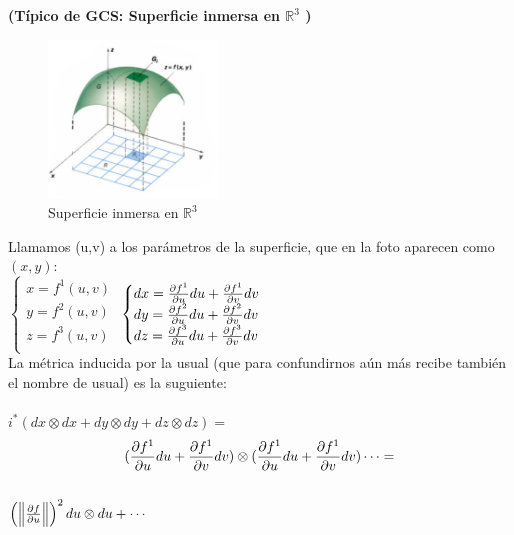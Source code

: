 \documentclass[palatino, bibnumbers]{apuntes}
\begin{document}
\begin{example}\textbf{(Típico de GCS: Superficie inmersa en $ℝ^3$ )}\\ 
	\begin{figure}
		\begin{center}
			\includegraphics[width=0.40\textwidth]{img/GT17_parametric_surface}
		\end{center}
		\caption{Superficie inmersa en $ℝ^3$ }
	\end{figure}
Llamamos (u,v) a los parámetros de la superficie, que en la foto aparecen como $(x,y)$:\\
$\begin{cases}
x=f^1(u,v)\\
y=f^2(u,v)\\
z=f^3(u,v) \\
\end{cases}$
$\begin{cases}
dx=\pdv{f^1}{u}du+\pdv{f^1}{v}dv\\
dy=\pdv{f^2}{u}du+\pdv{f^2}{v}dv\\
dz=\pdv{f^3}{u}du+\pdv{f^3}{v}dv \\
\end{cases}$
\\La métrica inducida por la usual (que para confundirnos aún más recibe también el nombre de usual) es la suguiente:\\ \\
$i^*(dx\otimes dx+dy\otimes dy+dz\otimes dz)=$$$(\pdv{f^1}{u}du+\pdv{f^1}{v}dv)\otimes(\pdv{f^1}{u}du+\pdv{f^1}{v}dv)\cdots=$$\\$\left(\norm{\pdv{f}{u}}\right)^2du\otimes du+\cdots$
\end{example}
\end{document}
